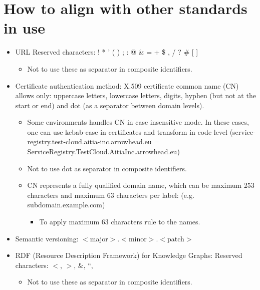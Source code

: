 \documentclass[a4paper]{arrowhead}
\begin{document}
\section{How to align with other standards in use}

\begin{itemize}

\item URL Reserved characters: ! * ' ( ) ; : @ \& = + \$ , / ? \# [ ] 
\begin{itemize}
    \item Not to use these as separator in composite identifiers.
\end{itemize}  
  
 \item Certificate authentication method: X.509 certificate common name (CN) allows only: uppercase letters, lowercase letters, digits, hyphen (but not at the start or end) and dot (as a separator between domain levels).
   \begin{itemize}
   \item Some environments handles CN in case insensitive mode. In these cases, one can use kebab-case in certificates and transform in code level (service-registry.test-cloud.aitia-inc.arrowhead.eu = ServiceRegistry.TestCloud.AitiaInc.arrowhead.eu) 
   \item Not to use dot as separator in composite identifiers.
   \item CN represents a fully qualified domain name, which can be maximum
     253 characters and maximum 63 characters per label: (e.g. subdomain.example.com) 
     \begin{itemize}
         \item To apply maximum 63 characters rule to the names.
     \end{itemize}
 \end{itemize}
 
 \item Semantic versioning: $<$major$>$.$<$minor$>$.$<$patch$>$
 \item RDF (Resource Description Framework) for Knowledge Graphs: Reserved characters: $<$, $>$, \&, “,
    \begin{itemize}
    \item Not to use these as separator in composite identifiers.
    \end{itemize}
 \end{itemize}
 


\end{document}

